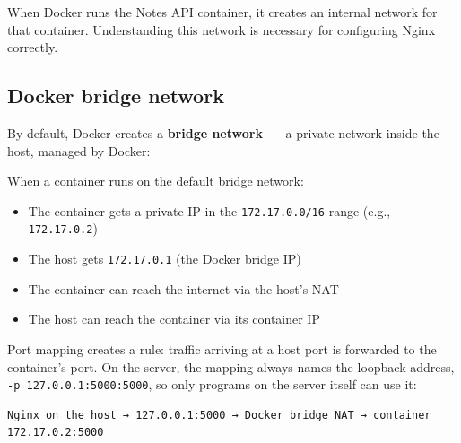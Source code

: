 When Docker runs the Notes API container, it creates an internal network for that container. Understanding this network is necessary for configuring Nginx correctly.

\subsection*{Docker bridge network}\label{22-network-configuration:docker-bridge-network}

By default, Docker creates a \textbf{bridge network}~--- a private network inside the host, managed by Docker:

\begin{codebox}[short]

\begin{Shaded}
\begin{Highlighting}[]
\end{Highlighting}
\end{Shaded}

\end{codebox}

\noindent{}When a container runs on the default bridge network:

\begin{itemize}
\tightlist
\item
  The container gets a private IP in the \texttt{172.17.0.0/16} range (e.g., \texttt{172.17.0.2})
\item
  The host gets \texttt{172.17.0.1} (the Docker bridge IP)
\item
  The container can reach the internet via the host's NAT
\item
  The host can reach the container via its container IP
\end{itemize}

\noindent{}Port mapping creates a rule: traffic arriving at a host port is forwarded to the container's port. On the server, the mapping always names the loopback address, \texttt{-p\ 127.0.0.1:5000:5000}, so only programs on the server itself can use it:

\begin{outputbox}[short]
\begin{Verbatim}[fontsize=\codesize, breaklines, breakanywhere, breaksymbolleft={\tiny\textcolor{muted}{$\hookrightarrow$}}]
Nginx on the host → 127.0.0.1:5000 → Docker bridge NAT → container 172.17.0.2:5000
\end{Verbatim}
\end{outputbox}

